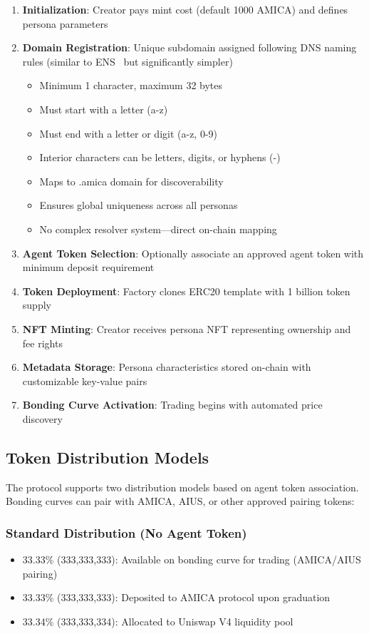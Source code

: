 \documentclass{article}
\begin{document}
\begin{enumerate}
    \item \textbf{Initialization}: Creator pays mint cost (default 1000 AMICA) and defines persona parameters
    \item \textbf{Domain Registration}: Unique subdomain assigned following DNS naming rules (similar to ENS~\cite{ens2016} but significantly simpler)
    \begin{itemize}
        \item Minimum 1 character, maximum 32 bytes
        \item Must start with a letter (a-z)
        \item Must end with a letter or digit (a-z, 0-9)
        \item Interior characters can be letters, digits, or hyphens (-)
        \item Maps to .amica domain for discoverability
        \item Ensures global uniqueness across all personas
        \item No complex resolver system—direct on-chain mapping
    \end{itemize}
    \item \textbf{Agent Token Selection}: Optionally associate an approved agent token with minimum deposit requirement
    \item \textbf{Token Deployment}: Factory clones ERC20 template with 1 billion token supply
    \item \textbf{NFT Minting}: Creator receives persona NFT representing ownership and fee rights
    \item \textbf{Metadata Storage}: Persona characteristics stored on-chain with customizable key-value pairs
    \item \textbf{Bonding Curve Activation}: Trading begins with automated price discovery
\end{enumerate}

\subsection{Token Distribution Models}

The protocol supports two distribution models based on agent token association. Bonding curves can pair with AMICA, AIUS, or other approved pairing tokens:

\subsubsection{Standard Distribution (No Agent Token)}
\begin{itemize}
    \item 33.33\% (333,333,333): Available on bonding curve for trading (AMICA/AIUS pairing)
    \item 33.33\% (333,333,333): Deposited to AMICA protocol upon graduation
    \item 33.34\% (333,333,334): Allocated to Uniswap V4 liquidity pool
\end{itemize}
\end{document}
